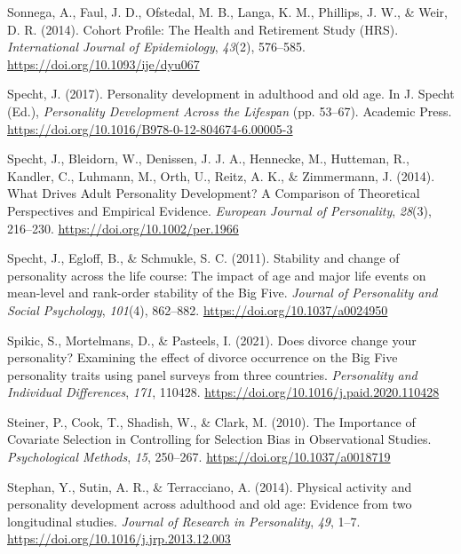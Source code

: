 \documentclass[
  english,
  man, noextraspace,floatsintext]{apa7}
\begin{document}
\leavevmode\hypertarget{ref-sonnegaCohortProfileHealth2014}{}%
Sonnega, A., Faul, J. D., Ofstedal, M. B., Langa, K. M., Phillips, J. W., \& Weir, D. R. (2014). Cohort Profile: The Health and Retirement Study (HRS). \emph{International Journal of Epidemiology}, \emph{43}(2), 576--585. \url{https://doi.org/10.1093/ije/dyu067}

\leavevmode\hypertarget{ref-spechtPersonalityDevelopmentAdulthood2017}{}%
Specht, J. (2017). Personality development in adulthood and old age. In J. Specht (Ed.), \emph{Personality Development Across the Lifespan} (pp. 53--67). Academic Press. \url{https://doi.org/10.1016/B978-0-12-804674-6.00005-3}

\leavevmode\hypertarget{ref-spechtWhatDrivesAdult2014}{}%
Specht, J., Bleidorn, W., Denissen, J. J. A., Hennecke, M., Hutteman, R., Kandler, C., Luhmann, M., Orth, U., Reitz, A. K., \& Zimmermann, J. (2014). What Drives Adult Personality Development? A Comparison of Theoretical Perspectives and Empirical Evidence. \emph{European Journal of Personality}, \emph{28}(3), 216--230. \url{https://doi.org/10.1002/per.1966}

\leavevmode\hypertarget{ref-spechtStabilityChangePersonality2011}{}%
Specht, J., Egloff, B., \& Schmukle, S. C. (2011). Stability and change of personality across the life course: The impact of age and major life events on mean-level and rank-order stability of the Big Five. \emph{Journal of Personality and Social Psychology}, \emph{101}(4), 862--882. \url{https://doi.org/10.1037/a0024950}

\leavevmode\hypertarget{ref-spikicDoesDivorceChange2021}{}%
Spikic, S., Mortelmans, D., \& Pasteels, I. (2021). Does divorce change your personality? Examining the effect of divorce occurrence on the Big Five personality traits using panel surveys from three countries. \emph{Personality and Individual Differences}, \emph{171}, 110428. \url{https://doi.org/10.1016/j.paid.2020.110428}

\leavevmode\hypertarget{ref-steinerImportanceCovariateSelection2010}{}%
Steiner, P., Cook, T., Shadish, W., \& Clark, M. (2010). The Importance of Covariate Selection in Controlling for Selection Bias in Observational Studies. \emph{Psychological Methods}, \emph{15}, 250--267. \url{https://doi.org/10.1037/a0018719}

\leavevmode\hypertarget{ref-stephanPhysicalActivityPersonality2014}{}%
Stephan, Y., Sutin, A. R., \& Terracciano, A. (2014). Physical activity and personality development across adulthood and old age: Evidence from two longitudinal studies. \emph{Journal of Research in Personality}, \emph{49}, 1--7. \url{https://doi.org/10.1016/j.jrp.2013.12.003}
\end{document}
